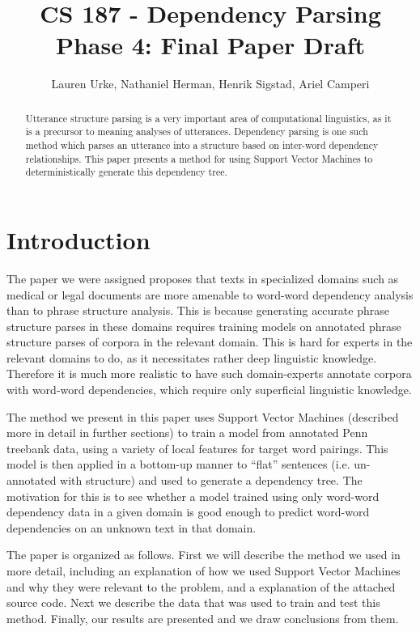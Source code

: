 \documentclass[12pt]{amsart}
\title{CS 187 - Dependency Parsing\\Phase 4: Final Paper Draft}
\author{Lauren Urke, Nathaniel Herman, Henrik Sigstad, Ariel Camperi}
\date{}
\begin{document}
    \begin{abstract}
    Utterance structure parsing is a very important area of computational linguistics, as it is a precursor to meaning analyses of utterances. Dependency parsing is one such method which parses an utterance into a structure based on inter-word dependency relationships. This paper presents a method for using Support Vector Machines to deterministically generate this dependency tree.
    \end{abstract}

    \maketitle

\section{Introduction}
The paper we were assigned \cite{yamada2003statistical} proposes that texts in specialized domains such as medical or legal documents are more amenable to word-word dependency analysis than to phrase structure analysis. This is because generating accurate phrase structure parses in these domains requires training models on annotated phrase structure parses of corpora in the relevant domain. This is hard for experts in the relevant domains to do, as it necessitates rather deep linguistic knowledge. Therefore it is much more realistic to have such domain-experts annotate corpora with word-word dependencies, which require only superficial linguistic knowledge.

The method we present in this paper uses Support Vector Machines (described more in detail in further sections) to train a model from annotated Penn treebank data, using a variety of local features for target word pairings. This model is then applied in a bottom-up manner to ``flat'' sentences (i.e. un-annotated with structure) and used to generate a dependency tree. The motivation for this is to see whether a model trained using only word-word dependency data in a given domain is good enough to predict word-word dependencies on an unknown text in that domain.

The paper is organized as follows. First we will describe the method we used in more detail, including an explanation of how we used Support Vector Machines and why they were relevant to the problem, and a explanation of the attached source code. Next we describe the data that was used to train and test this method. Finally, our results are presented and we draw conclusions from them.
\end{document}
